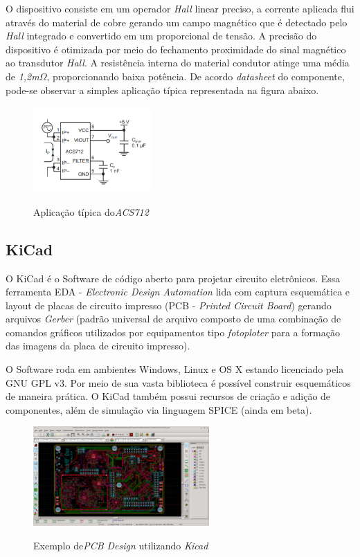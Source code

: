 O dispositivo consiste em um operador \textit{Hall} linear preciso, a corrente aplicada flui através do material de cobre gerando um campo magnético que é detectado pelo \textit{Hall} integrado e convertido em um proporcional de tensão. A precisão do dispositivo é otimizada por meio do fechamento proximidade do sinal magnético ao transdutor \textit{Hall}. A resistência interna do material condutor atinge uma média de \textit{1,2m}$\Omega$, proporcionando baixa potência. De acordo \textit{datasheet} do componente, pode-se observar a simples aplicação típica representada na figura abaixo.
 
\begin{figure}[H]
	\centering
	\caption{Aplicação típica do\textit{ACS712}}
	\includegraphics[width=0.4\textwidth]{figuras/ACS712_typical.png}
	\label{fig:acs712_typical}
\end{figure} 


\subsection{KiCad}

O KiCad é o Software de código aberto para projetar circuito eletrônicos. Essa ferramenta EDA - \textit{Electronic Design Automation} lida com captura esquemática e layout de placas de circuito impresso (PCB - \textit{Printed Circuit Board}) gerando arquivos \textit{Gerber} (padrão universal de arquivo composto de uma combinação de comandos gráficos utilizados por equipamentos tipo \textit{fotoploter} para a formação das imagens da placa de circuito impresso).

O Software roda em ambientes Windows, Linux e OS X estando licenciado pela GNU GPL v3. Por meio de sua vasta biblioteca é possível construir esquemáticos de maneira prática. O KiCad também possui recursos de criação e adição de componentes, além de simulação via linguagem SPICE (ainda em beta). 

\begin{figure}[H]
	\centering
	\caption{Exemplo de\textit{PCB Design} utilizando \textit{Kicad}}
	\includegraphics[width=0.6\textwidth]{figuras/kicad_pcbnew.png}
	\label{fig:kicad_pcbnew}
\end{figure} 
 

